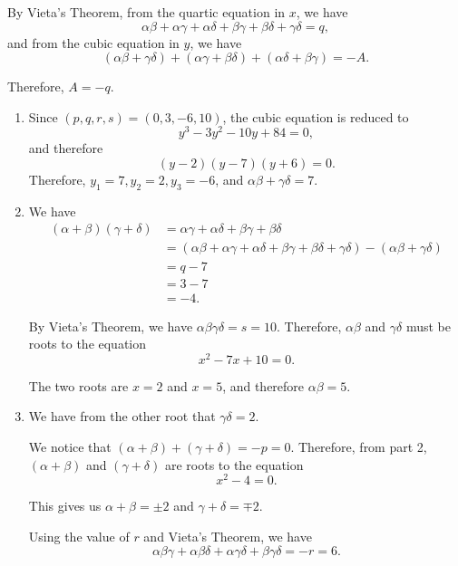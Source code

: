 \Question{\currfilebase}

By Vieta's Theorem, from the quartic equation in \(x\), we have
\[
    \alpha\beta + \alpha\gamma + \alpha\delta + \beta\gamma + \beta\delta + \gamma\delta = q,
\]
and from the cubic equation in \(y\), we have
\[
    \left(\alpha\beta + \gamma\delta\right) + \left(\alpha\gamma + \beta\delta\right) + \left(\alpha\delta + \beta\gamma\right) = -A.
\]

Therefore, \(A = -q\).

\begin{enumerate}
    \item Since \((p, q, r, s) = (0, 3, -6, 10)\), the cubic equation is reduced to
    \[
        y^3 - 3y^2 - 10y + 84 = 0, 
    \]
    and therefore
    \[
        (y - 2)(y - 7)(y + 6) = 0. 
    \]
    Therefore, \(y_1 = 7, y_2 = 2, y_3 = -6\), and \(\alpha\beta + \gamma\delta = 7\).

    \item We have
    \begin{align*}
        (\alpha + \beta)(\gamma + \delta) &= \alpha\gamma + \alpha\delta + \beta\gamma + \beta\delta\\
        &= \left(\alpha\beta + \alpha\gamma + \alpha\delta + \beta\gamma + \beta\delta + \gamma\delta\right) - \left(\alpha\beta + \gamma\delta\right)\\
        &= q - 7\\
        &= 3 - 7\\
        &= -4.
    \end{align*}

    By Vieta's Theorem, we have \(\alpha\beta\gamma\delta = s = 10\). Therefore, \(\alpha\beta\) and \(\gamma\delta\) must be roots to the equation
    \[
        x^2 - 7x + 10 = 0.
    \]

    The two roots are \(x = 2\) and \(x = 5\), and therefore \(\alpha\beta = 5\).

    \item We have from the other root that \(\gamma\delta = 2\).
    
    We notice that \((\alpha + \beta) + (\gamma + \delta) = -p = 0\). Therefore, from part 2, \((\alpha + \beta)\) and \((\gamma + \delta)\) are roots to the equation
    \[
        x^2 - 4 = 0.
    \]

    This gives us \(\alpha + \beta = \pm 2\) and \(\gamma + \delta = \mp 2\).

    Using the value of \(r\) and Vieta's Theorem, we have
    \[
    \alpha\beta\gamma + \alpha\beta\delta + \alpha\gamma\delta + \beta\gamma\delta = -r = 6.
    \]


\end{enumerate}
